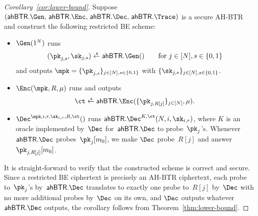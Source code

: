 \begin{proof}
[%
Corollary~\ref{cor:lower-bound}]
Suppose
${(\AHBTR.\Gen,\,\AHBTR.\Enc,\,\AHBTR.\Dec,\,\AHBTR.\Trace)}$
is a secure AH-BTR and
construct the following restricted BE scheme:
\begin{itemize}
\item $\Gen(1^N)$ runs
\begin{align*}
(\pk_{j,s},\sk_{j,s})\draws\AHBTR.\Gen()\qquad\textup{for }j\in[N],s\in\bit
\end{align*}
and outputs ${\mpk=\{\pk_{j,s}\}_{j\in[N],s\in\bit}}$ with $\{\sk_{j,s}\}_{j\in[N],s\in\bit}$.
\item $\Enc(\mpk,R,\mu)$ runs and outputs
\begin{align*}
\ct\draws\AHBTR.\Enc(\{\pk_{j,R[j]}\}_{j\in[N]},\mu).
\end{align*}
\item $\Dec^{\mpk,i,r,\sk_{i,r},R,\ct}()$
runs $\AHBTR.\Dec^{K,\ct}(N,i,\sk_{i,r})$,
where $K$ is an oracle implemented by~$\Dec$ for~$\AHBTR.\Dec$ to probe~$\pk_j$'s.
Whenever $\AHBTR.\Dec$ probes~$\pk_j[m_0]$,
we make $\Dec$ probe~$R[j]$ and answer~$\pk_{j,R[j]}[m_0]$.
\end{itemize}
It is straight-forward to verify that the constructed scheme is correct and secure.
Since
a restricted BE ciphertext is precisely an AH-BTR ciphertext,
each probe to~$\pk_j$'s by~$\AHBTR.\Dec$ translates to exactly one probe to~$R[j]$ by~$\Dec$ with no more additional probes by~$\Dec$ on its own, and
$\Dec$ outputs whatever $\AHBTR.\Dec$ outputs,
the corollary follows from Theorem~\ref{thm:lower-bound}.
\end{proof}
